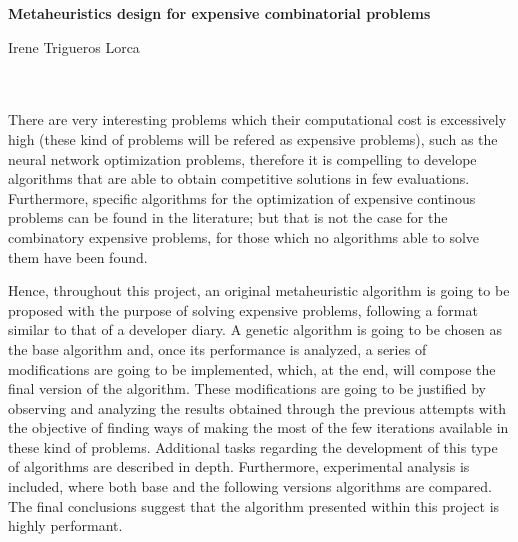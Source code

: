 \cleardoublepage


\thispagestyle{empty}


\begin{center}
{\large\bfseries Metaheuristics design for expensive combinatorial problems }\\
\end{center}
\begin{center}
Irene Trigueros Lorca\\
\end{center}

\\

\vspace{0.7cm}
\\

There are very interesting problems which their computational cost is excessively high (these kind of problems will be refered as expensive problems), such as the neural network optimization problems, therefore it is compelling to develope algorithms that are able to obtain competitive solutions in few evaluations. 
Furthermore, specific algorithms for the optimization of expensive continous problems can be found in the literature; but that is not the case for the combinatory expensive problems, for those which no algorithms able to solve them have been found.

Hence, throughout this project, an original metaheuristic algorithm is going to be proposed with the purpose of solving expensive problems, following a format similar to that of a developer diary. 
A genetic algorithm is going to be chosen as the base algorithm and, once its performance is analyzed, a series of modifications are going  to be implemented, which, at the end, will compose the final version of the algorithm. 
These modifications are going to be justified by observing and analyzing the results obtained through the previous attempts with the objective of finding ways of making the most of the few iterations available in these kind of problems. 
Additional tasks regarding the development of this type of algorithms are described in depth. 
Furthermore, experimental analysis is included, where both base and the following versions algorithms are compared. 
The final conclusions suggest that the algorithm presented within this project is highly performant.

